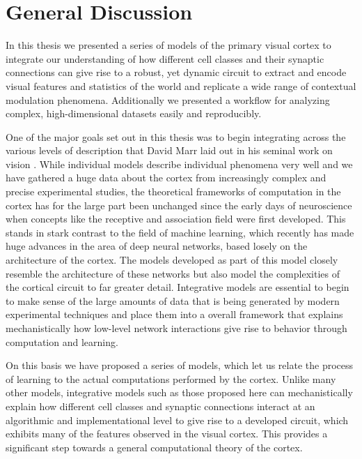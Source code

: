 \chapter{General Discussion}

In this thesis we presented a series of models of the primary visual
cortex to integrate our understanding of how different cell classes
and their synaptic connections can give rise to a robust, yet dynamic
circuit to extract and encode visual features and statistics of the
world and replicate a wide range of contextual modulation
phenomena. Additionally we presented a workflow for analyzing complex,
high-dimensional datasets easily and reproducibly.

One of the major goals set out in this thesis was to begin integrating
across the various levels of description that David Marr laid out in
his seminal work on vision \citep{Marr1982}. While individual models
describe individual phenomena very well and we have gathered a huge
data about the cortex from increasingly complex and precise
experimental studies, the theoretical frameworks of computation in the
cortex has for the large part been unchanged since the early days of
neuroscience when concepts like the receptive and association field
were first developed. This stands in stark contrast to the field of
machine learning, which recently has made huge advances in the area of
deep neural networks, based losely on the architecture of the
cortex. The models developed as part of this model closely resemble
the architecture of these networks but also model the complexities of
the cortical circuit to far greater detail. Integrative models are
essential to begin to make sense of the large amounts of data that is
being generated by modern experimental techniques and place them into
a overall framework that explains mechanistically how low-level
network interactions give rise to behavior through computation and
learning.

On this basis we have proposed a series of models, which let us relate
the process of learning to the actual computations performed by the
cortex. Unlike many other models, integrative models such as those
proposed here can mechanistically explain how different cell classes
and synaptic connections interact at an algorithmic and
implementational level to give rise to a developed circuit, which
exhibits many of the features observed in the visual cortex. This
provides a significant step towards a general computational theory of
the cortex.

